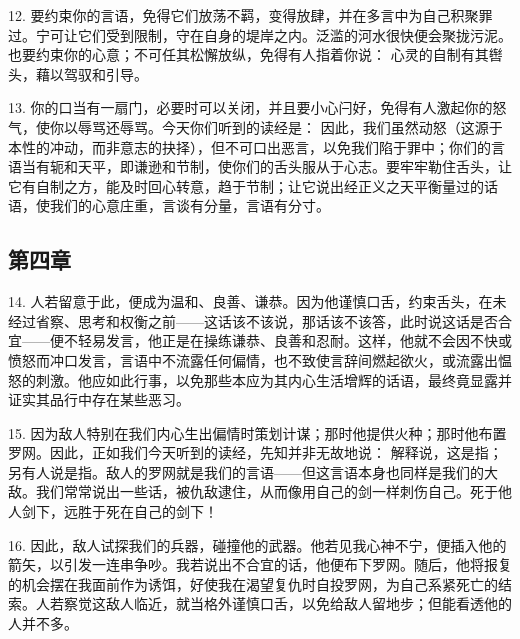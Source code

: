 12. 要约束你的言语，免得它们放荡不羁，变得放肆，并在多言中为自己积聚罪过。宁可让它们受到限制，守在自身的堤岸之内。泛滥的河水很快便会聚拢污泥。也要约束你的心意；不可任其松懈放纵，免得有人指着你说： 心灵的自制有其辔头，藉以驾驭和引导。\par

13. 你的口当有一扇门，必要时可以关闭，并且要小心闩好，免得有人激起你的怒气，使你以辱骂还辱骂。今天你们听到的读经是： 因此，我们虽然动怒（这源于本性的冲动，而非意志的抉择），但不可口出恶言，以免我们陷于罪中；你们的言语当有轭和天平，即谦逊和节制，使你们的舌头服从于心志。要牢牢勒住舌头，让它有自制之方，能及时回心转意，趋于节制；让它说出经正义之天平衡量过的话语，使我们的心意庄重，言谈有分量，言语有分寸。\par


\subsection{第四章}

\par

14. 人若留意于此，便成为温和、良善、谦恭。因为他谨慎口舌，约束舌头，在未经过省察、思考和权衡之前——这话该不该说，那话该不该答，此时说这话是否合宜——便不轻易发言，他正是在操练谦恭、良善和忍耐。这样，他就不会因不快或愤怒而冲口发言，言语中不流露任何偏情，也不致使言辞间燃起欲火，或流露出愠怒的刺激。他应如此行事，以免那些本应为其内心生活增辉的话语，最终竟显露并证实其品行中存在某些恶习。\par

15. 因为敌人特别在我们内心生出偏情时策划计谋；那时他提供火种；那时他布置罗网。因此，正如我们今天听到的读经，先知并非无故地说： 解释说，这是指；另有人说是指。敌人的罗网就是我们的言语——但这言语本身也同样是我们的大敌。我们常常说出一些话，被仇敌逮住，从而像用自己的剑一样刺伤自己。死于他人剑下，远胜于死在自己的剑下！\par

16. 因此，敌人试探我们的兵器，碰撞他的武器。他若见我心神不宁，便插入他的箭矢，以引发一连串争吵。我若说出不合宜的话，他便布下罗网。随后，他将报复的机会摆在我面前作为诱饵，好使我在渴望复仇时自投罗网，为自己系紧死亡的结索。人若察觉这敌人临近，就当格外谨慎口舌，以免给敌人留地步；但能看透他的人并不多。\par

